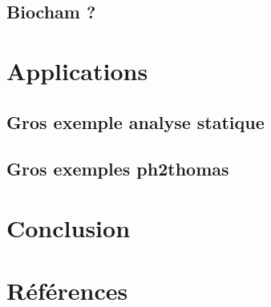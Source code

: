 \documentclass[a4paper]{report}
\begin{document}
  \section{Biocham ?}

\chapter{Applications}
  \section{Gros exemple analyse statique}
  \section{Gros exemples ph2thomas}

\chapter{Conclusion}

\chapter*{Références}


\end{document}
